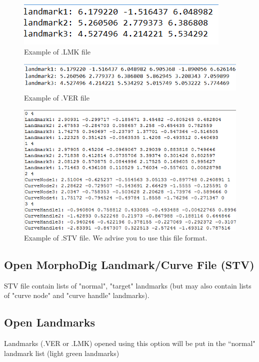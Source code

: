 \begin{figure}
  \centering
  \includegraphics[scale=0.5]{images/07/landmarks/LMK_file.png}
 \caption{Example of .LMK file}
\label{LMK_file}
\end{figure}

\begin{figure}
  \centering
  \includegraphics[scale=0.5]{images/07/landmarks/VER_file.png}
 \caption{Example of .VER file}
\label{VER_file}
\end{figure}
\begin{figure}
  \centering
  \includegraphics[scale=0.5]{images/07/landmarks/STV_file.png}
 \caption{Example of .STV file. We advise you to use this file format.}
\label{STV_file}
\end{figure}

\subsection{Open MorphoDig Landmark/Curve File (STV)}
STV file contain lists of "normal", "target" landmarks (but may also contain lists of "curve node" and "curve handle" landmarks).
\subsection{Open Landmarks}
Landmarks (.VER or .LMK) opened using this option will be put in the ``normal" landmark list (light green landmarks)
